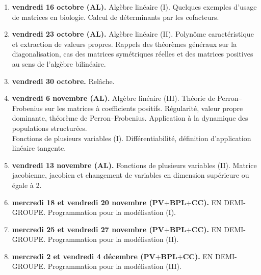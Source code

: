 \documentclass[11pt]{article}
\begin{document}
\begin{enumerate}





\item \textbf{vendredi 16 octobre (AL).} Alg\`ebre lin\'eaire (I). Quelques exemples d'usage de matrices en biologie. Calcul de d\'eterminants par les cofacteurs.

\bigskip


\item \textbf{vendredi 23 octobre (AL).}  Alg\`ebre lin\'eaire (II). Polyn\^ome caract\'eristique et extraction de valeurs propres. Rappels des th\'eor\`emes g\'en\'eraux sur la diagonalisation, cas des matrices sym\'etriques r\'eelles et des matrices positives au sens de l'alg\`ebre bilin\'eaire.

\bigskip


\item  \textbf{vendredi 30 octobre.} Rel\^ache.

\bigskip

 
\item \textbf{vendredi 6 novembre (AL).} Alg\`ebre lin\'eaire (III). Th\'eorie de Perron--Frobenius sur les matrices \`a coefficients positifs. R\'egularit\'e, valeur propre dominante, th\'eor\`eme de Perron--Frobenius. Application \`a la dynamique des populations structur\'ees.\\
Fonctions de plusieurs variables (I). Diff\'erentiabilit\'e, d\'efinition d'application lin\'eaire tangente.

\bigskip



\item \textbf{vendredi 13 novembre (AL).}  Fonctions de plusieurs variables (II). Matrice jacobienne, jacobien et changement de variables en dimension sup\'erieure ou \'egale \`a 2. 
\bigskip


\item \textbf{mercredi 18 et vendredi 20 novembre (PV$+$BPL$+$CC).} EN DEMI-GROUPE. Programmation pour la mod\'elisation (I). 

\bigskip


\item \textbf{mercredi 25 et vendredi 27 novembre (PV$+$BPL$+$CC).} EN DEMI-GROUPE. Programmation pour la mod\'elisation (II). 

\bigskip


\item \textbf{mercredi 2 et vendredi 4 d\'ecembre (PV$+$BPL$+$CC).} EN DEMI-GROUPE. Programmation pour la mod\'elisation (III). 


\end{enumerate}
\end{document}
